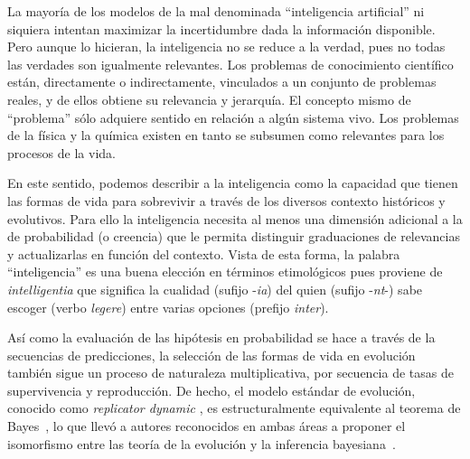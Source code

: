 \documentclass[a4paper,11pt]{book}
\theoremstyle{definition}
\begin{document}

La mayoría de los modelos de la mal denominada ``inteligencia artificial'' ni siquiera intentan maximizar la incertidumbre dada la información disponible.
%
Pero aunque lo hicieran, la inteligencia no se reduce a la verdad, pues no todas las verdades son igualmente relevantes.
%
Los problemas de conocimiento científico están, directamente o indirectamente, vinculados a un conjunto de problemas reales, y de ellos obtiene su relevancia y jerarquía.
%
El concepto mismo de ``problema'' sólo adquiere sentido en relación a algún sistema vivo.
%
Los problemas de la física y la química existen en tanto se subsumen como relevantes para los procesos de la vida.


En este sentido, podemos describir a la inteligencia como la capacidad que tienen las formas de vida para sobrevivir a través de los diversos contexto históricos y evolutivos.
%
Para ello la inteligencia necesita al menos una dimensión adicional a la de probabilidad (o creencia) que le permita distinguir graduaciones de relevancias y actualizarlas en función del contexto.
%
Vista de esta forma, la palabra ``inteligencia'' es una buena elección en términos etimológicos pues proviene de \emph{intelligentia} que significa la cualidad (sufijo -\emph{ia}) del quien (sufijo -\emph{nt}-) sabe escoger (verbo \emph{legere}) entre varias opciones (prefijo \emph{inter}).


Así como la evaluación de las hipótesis en probabilidad se hace a través de la secuencias de predicciones, la selección de las formas de vida en evolución también sigue un proceso de naturaleza multiplicativa, por secuencia de tasas de supervivencia y reproducción.
%
De hecho, el modelo estándar de evolución, conocido como \emph{replicator dynamic} \cite{taylor1978-replicatorDynamic}, es estructuralmente equivalente al teorema de Bayes~\cite{harper2009-replicatorAsInference,shalizi2009-replicatorAsInference}, lo que llevó a autores reconocidos en ambas áreas a proponer el isomorfismo entre las teoría de la evolución y la inferencia bayesiana~\cite{czegel2019-bayesianEvolution, czegel2022-bayesDarwin}.

\end{document}
